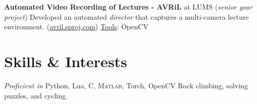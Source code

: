 \documentclass[10pt,twoside,a4paper]{article}
\newif\ifdetail
\newcommand\CPP{C\nolinebreak[4]\hspace{-.05em}\raisebox{.4ex}{\relsize{-3}{\textbf{++}}}}
\begin{document}
\textbf{Automated Video Recording of Lectures - AVRiL} at LUMS (\textit{senior year project}) \newline
Developed an automated \textit{director} that captures a multi-camera lecture environment. %
(\href{http://avril.sproj.com}{avril.sproj.com}) \underline{Tools}: OpenCV%

\ifdetail
\textbf{Improvements in Google's MapReduce Architecture} at LUMS \newline
Research enabling MapReduce to run speculatively on skewed input data. (\href{https://code.google.com/p/mrplus/}{tinyurl.com/q3detyg}) \underline{Tools}: Python, \textsc{Hadoop}
\fi

\ifdetail
\textbf{Surveillance Video Compression through Foveation} as a \textit{research initiative} \newline
Researched the development of a novel H.264 encoder which assigns more bits to areas where the human visual system is more likely to foveate in surveillance footage. (\href{http://suraj.lums.edu.pk/~foveation}{http://suraj.lums.edu.pk/\(\sim\)foveation}) \underline{Tools}: \textsc{Java} Media Framework
\fi

\section{Skills \& Interests}
\textit{Proficient in} Python, Lua, \textsc{\CPP}, \textsc{Matlab}, Torch, OpenCV \hspace{3mm}\textbar\hspace{3mm} Rock climbing, solving puzzles, and cycling.

\ifdetail
\end{document}
